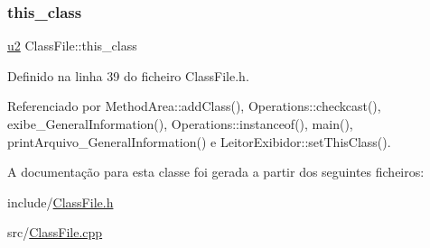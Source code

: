 \subsubsection{\texorpdfstring{this\+\_\+class}{this\_class}}
{\footnotesize\ttfamily \hyperlink{BasicTypes_8h_a732cde1300aafb73b0ea6c2558a7a54f}{u2} Class\+File\+::this\+\_\+class}



Definido na linha 39 do ficheiro Class\+File.\+h.



Referenciado por Method\+Area\+::add\+Class(), Operations\+::checkcast(), exibe\+\_\+\+General\+Information(), Operations\+::instanceof(), main(), print\+Arquivo\+\_\+\+General\+Information() e Leitor\+Exibidor\+::set\+This\+Class().



A documentação para esta classe foi gerada a partir dos seguintes ficheiros\+:\begin{DoxyCompactItemize}
\item 
include/\hyperlink{ClassFile_8h}{Class\+File.\+h}\item 
src/\hyperlink{ClassFile_8cpp}{Class\+File.\+cpp}\end{DoxyCompactItemize}
